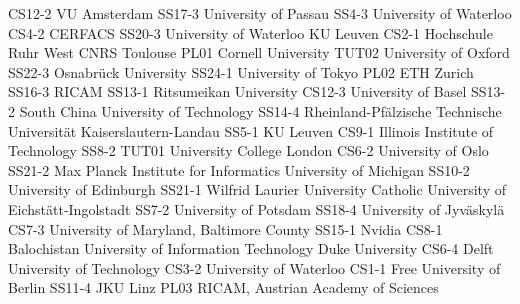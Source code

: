 \begin{multicols}{2}
{CS12-2}
{}
{ VU Amsterdam }
{SS17-3}
{}
{ University of Passau }
{SS4-3}
{}
{ University of Waterloo }
{CS4-2}
{}
{ CERFACS }
{SS20-3}
{}
{ University of Waterloo }
{}
{}
{ KU Leuven }
{CS2-1}
{}
{ Hochschule Ruhr West }
{}
{}
{ CNRS Toulouse }
{PL01}
{}
{ Cornell University }
{TUT02}
{}
{ University of Oxford }
{SS22-3}
{}
{ Osnabrück University }
{SS24-1}
{}
{ University of Tokyo }
{PL02}
{}
{ ETH Zurich }
{SS16-3}
{}
{ RICAM }
{SS13-1}
{}
{ Ritsumeikan University }
{CS12-3}
{}
{ University of Basel }
{SS13-2}
{}
{ South China University of Technology }
{SS14-4}
{}
{ Rheinland-Pfälzische Technische Universität Kaiserslautern-Landau }
{SS5-1}
{}
{ KU Leuven }
{CS9-1}
{}
{ Illinois Institute of Technology }
{SS8-2}
{TUT01}
{ University College London }
{CS6-2}
{}
{ University of Oslo }
{SS21-2}
{}
{ Max Planck Institute for Informatics }
{}
{}
{ University of Michigan }
{SS10-2}
{}
{ University of Edinburgh }
{SS21-1}
{}
{ Wilfrid Laurier University }
{}
{}
{ Catholic University of Eichstätt-Ingolstadt }
{SS7-2}
{}
{ University of Potsdam }
{SS18-4}
{}
{ University of Jyväskylä }
{CS7-3}
{}
{ University of Maryland, Baltimore County }
{SS15-1}
{}
{ Nvidia }
{CS8-1}
{}
{ Balochistan University of Information Technology }
{}
{}
{ Duke University }
{CS6-4}
{}
{ Delft University of Technology }
{CS3-2}
{}
{ University of Waterloo }
{CS1-1}
{}
{ Free University of Berlin }
{SS11-4}
{}
{ JKU Linz }
{PL03}
{}
{ RICAM, Austrian Academy of Sciences }

\end{multicols}
